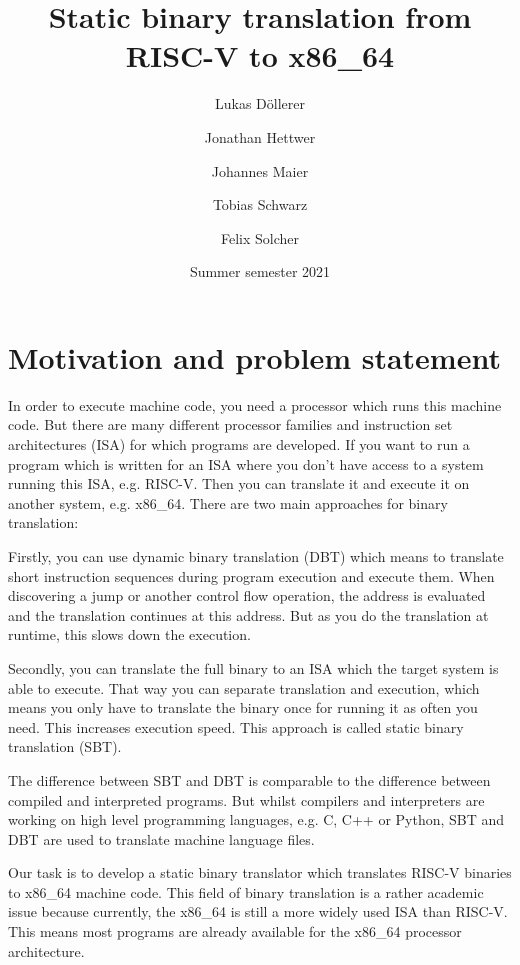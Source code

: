 \documentclass[course=eragp]{aspdoc}
\author{Lukas Döllerer \and Jonathan Hettwer \and Johannes Maier \and Tobias Schwarz \and Felix Solcher}
\date{Summer semester 2021}
\title{Static binary translation from RISC-V to x86\_64}
\begin{document}
\maketitle

\tableofcontents

\pagebreak

\section{Motivation and problem statement}


In order to execute machine code, you need a processor which runs this machine code.
But there are many different processor families and instruction set architectures (ISA)
for which programs are developed. If you want to run a program which is written for
an ISA where you don't have access to a system running this ISA, e.g. RISC-V. Then you can
translate it and execute it on another system, e.g. x86\_64. There are two main approaches
for binary translation: \par
Firstly, you can use dynamic binary translation (DBT) which means to translate short
instruction sequences during program execution and execute them. When discovering a jump or another
control flow operation, the address is evaluated and the translation continues at this
address. But as you do the translation at runtime, this slows down the execution. \par
Secondly, you can translate the full binary to an ISA which the target system is able to
execute. That way you can separate translation and execution, which means you only have to translate
the binary once for running it as often you need.
This increases execution speed. This approach is called static binary translation (SBT).\par
The difference between SBT and DBT is comparable to the difference between compiled
and interpreted programs. But whilst compilers and interpreters are working on
high level programming languages, e.g. C, C++ or Python, SBT and DBT are used to translate
machine language files.\par
Our task is to develop a static binary translator which translates RISC-V binaries to x86\_64 machine code. 
This field of binary translation is a rather academic issue because currently, the x86\_64 is still a more
widely used ISA than RISC-V. This means most programs are already available for the x86\_64 processor architecture.
\end{document}
